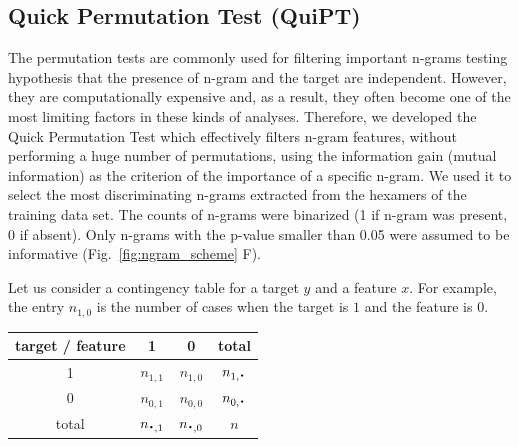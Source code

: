 \documentclass[fleqn,10pt,twoside]{gcb15submission}
\newcommand*{\bigcdot}{\raisebox{-0.25ex}{\scalebox{1.5}{$\cdot$}}}
\begin{document}
\subsection{Quick Permutation Test (QuiPT)}

  The permutation tests are commonly used for filtering important n-grams testing hypothesis that the presence of n-gram and the target are independent. 
However, they are computationally expensive and, as a result, they often become 
one of the most limiting factors in these kinds of analyses. Therefore, we developed the Quick Permutation Test which effectively filters n-gram features, without performing a huge number of permutations, using the information gain (mutual information) as the criterion of the importance of a specific n-gram. We used it to select the most discriminating n-grams extracted from the hexamers of the training data set. The counts of n-grams were binarized (1 if n-gram was present, 0 if absent). Only n-grams with the p-value smaller than 0.05 were assumed to be informative (Fig.~\ref{fig:ngram_scheme} F).
%
%
%
%
%

Let us consider a contingency table for a target $y$ and 
a feature $x$. For example, the entry $n_{1,0}$ is the number of cases when the 
target is $1$ and the feature is $0$.

\begin{center}
\begin{tabular}{ | c || c | c | c | }
%
%
  \hline			
  target / feature & 1 & 0 & total\\ \hline
 1 & $n_{1,1}$ & $n_{1,0}$ & $n_{1,\bigcdot}$ \\
 0 & $n_{0,1}$ & $n_{0,0}$ & $n_{0,\bigcdot}$ \\ \hline
 total & $n_{\bigcdot,1}$ & $n_{\bigcdot,0}$ & $n$ \\
  \hline  
\end{tabular} 
\end{center}
\end{document}
